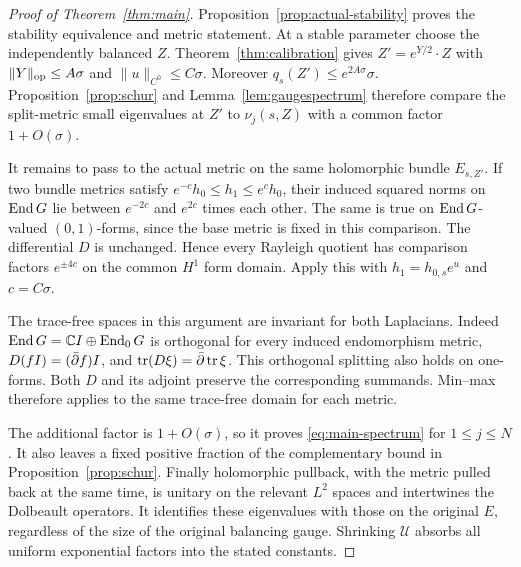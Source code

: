 \begin{proof}[Proof of Theorem~\ref{thm:main}]
Proposition~\ref{prop:actual-stability} proves the stability
equivalence and metric statement. At a stable parameter choose
the independently balanced $Z$. Theorem~\ref{thm:calibration}
gives $Z'=e^{Y/2}\cdot Z$ with $\|Y\|_{\mathrm{op}}\le A\sigma$
and $\|u\|_{C^0}\le C\sigma$. Moreover
$q_s(Z')\le e^{2A\sigma}\sigma$.
Proposition~\ref{prop:schur} and Lemma~\ref{lem:gaugespectrum}
therefore compare the split-metric small eigenvalues at $Z'$
to $\nu_j(s,Z)$ with a common factor $1+O(\sigma)$.

It remains to pass to the actual metric on the same holomorphic
bundle $E_{s,Z'}$. If two bundle metrics satisfy
$e^{-c}h_0\le h_1\le e^ch_0$, their induced squared norms on
$\operatorname{End} G$ lie between $e^{-2c}$ and $e^{2c}$ times each other.
The same is true on $\operatorname{End} G$-valued $(0,1)$-forms, since the
base metric is fixed in this comparison. The differential $D$
is unchanged. Hence every Rayleigh quotient has comparison
factors $e^{\pm4c}$ on the common $H^1$ form domain. Apply this
with $h_1=h_{0,s}e^u$ and $c=C\sigma$.

The trace-free spaces in this argument are invariant for both
Laplacians. Indeed $\operatorname{End} G=\mathbb C I\oplus\operatorname{End}_0G$ is orthogonal
for every induced endomorphism metric, $D(fI)=(\bar\partial f)I$, and
$\operatorname{tr}(D\xi)=\bar\partial\operatorname{tr}\xi$. This orthogonal splitting also
holds on one-forms. Both $D$ and its adjoint preserve the
corresponding summands. Min--max therefore applies to the same
trace-free domain for each metric.

The additional factor is $1+O(\sigma)$, so it proves
\eqref{eq:main-spectrum} for $1\le j\le N$. It also leaves a
fixed positive fraction of the complementary bound in
Proposition~\ref{prop:schur}. Finally holomorphic pullback,
with the metric pulled back at the same time, is unitary on
the relevant $L^2$ spaces and intertwines the Dolbeault
operators. It identifies these eigenvalues with those on
the original $E$, regardless of the size of the original
balancing gauge. Shrinking $\mathcal U$ absorbs all uniform
exponential factors into the stated constants.
\end{proof}
